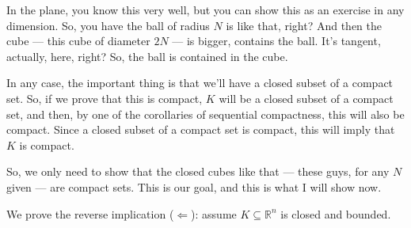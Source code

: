 \begin{proofWrapper}
\begin{speech}[00:52:33 - 00:54:20]
In the plane, you know this very well, but you can show this as an exercise in any dimension. So, you have the ball of radius $N$ is like that, right?  And then the cube --- this cube of diameter $2N$ --- is bigger, contains the ball.  It's tangent, actually, here, right? So, the ball is contained in the cube.

In any case, the important thing is that we'll have a closed subset of a compact set. So, if we prove that this is compact, $K$ will be a closed subset of a compact set, and then, by one of the corollaries of sequential compactness, this will also be compact. Since a closed subset of a compact set is compact,  this will imply that $K$ is compact. 

So, we only need to show that the closed cubes like that --- these guys,  for any $N$ given --- are compact sets. This is our goal, and this is what I will show now.
\end{speech}

\begin{content}
We prove the reverse implication ($\Longleftarrow$): assume $K \subseteq \mathbb{R}^n$ is closed and bounded.



\end{content}
\end{proofWrapper}
